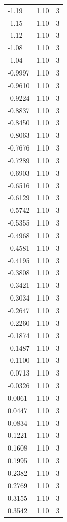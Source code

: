 \begin{longtable}{lrr}
  -1.19 & 1.10 & 3 \\
  -1.15 & 1.10 & 3 \\
  -1.12 & 1.10 & 3 \\
  -1.08 & 1.10 & 3 \\
  -1.04 & 1.10 & 3 \\
  -0.9997 & 1.10 & 3 \\
  -0.9610 & 1.10 & 3 \\
  -0.9224 & 1.10 & 3 \\
  -0.8837 & 1.10 & 3 \\
  -0.8450 & 1.10 & 3 \\
  -0.8063 & 1.10 & 3 \\
  -0.7676 & 1.10 & 3 \\
  -0.7289 & 1.10 & 3 \\
  -0.6903 & 1.10 & 3 \\
  -0.6516 & 1.10 & 3 \\
  -0.6129 & 1.10 & 3 \\
  -0.5742 & 1.10 & 3 \\
  -0.5355 & 1.10 & 3 \\
  -0.4968 & 1.10 & 3 \\
  -0.4581 & 1.10 & 3 \\
  -0.4195 & 1.10 & 3 \\
  -0.3808 & 1.10 & 3 \\
  -0.3421 & 1.10 & 3 \\
  -0.3034 & 1.10 & 3 \\
  -0.2647 & 1.10 & 3 \\
  -0.2260 & 1.10 & 3 \\
  -0.1874 & 1.10 & 3 \\
  -0.1487 & 1.10 & 3 \\
  -0.1100 & 1.10 & 3 \\
  -0.0713 & 1.10 & 3 \\
  -0.0326 & 1.10 & 3 \\
  0.0061 & 1.10 & 3 \\
  0.0447 & 1.10 & 3 \\
  0.0834 & 1.10 & 3 \\
  0.1221 & 1.10 & 3 \\
  0.1608 & 1.10 & 3 \\
  0.1995 & 1.10 & 3 \\
  0.2382 & 1.10 & 3 \\
  0.2769 & 1.10 & 3 \\
  0.3155 & 1.10 & 3 \\
  0.3542 & 1.10 & 3 \\

\end{longtable}
